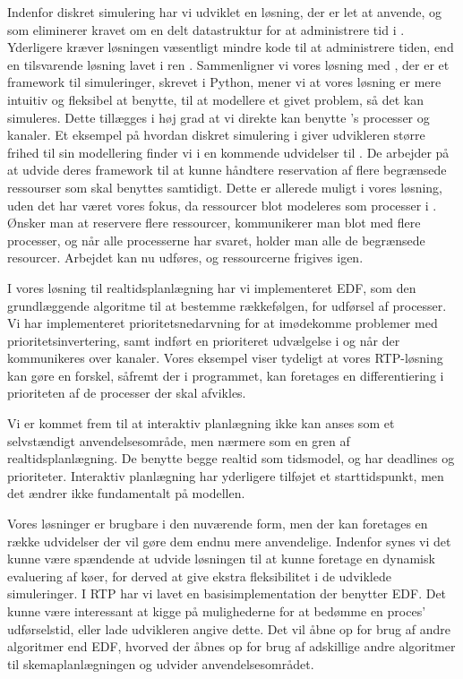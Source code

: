 Indenfor diskret simulering har vi udviklet en løsning, der er let at anvende, og som eliminerer kravet om en delt datastruktur for at administrere tid i \pycsp. Yderligere kræver løsningen væsentligt mindre kode til at administrere tiden, end en tilsvarende løsning lavet i ren \pycsp. 
Sammenligner vi vores løsning med \simpy, der er et framework til simuleringer, skrevet i Python, mener vi at vores løsning er mere intuitiv og fleksibel at benytte, til at modellere et givet problem, så det kan  simuleres. Dette tillægges i høj grad at vi direkte kan benytte \pycsp's processer og kanaler. Et eksempel på hvordan diskret simulering i \pycsp giver udvikleren større frihed til sin modellering finder vi i en kommende udvidelser til \simpy. De arbejder  på at udvide deres framework til at kunne håndtere reservation af flere begrænsede ressourser som skal benyttes samtidigt. Dette er allerede muligt i vores løsning, uden det har været vores fokus, da ressourcer blot modeleres som processer i \pycsp. Ønsker man at reservere flere ressourcer, kommunikerer man blot med flere processer, og når alle processerne har svaret, holder man alle de begrænsede resourcer. Arbejdet kan nu udføres, og ressourcerne frigives igen. 

I vores løsning til realtidsplanlægning har vi implementeret EDF, som den grundlæggende algoritme til at bestemme rækkefølgen, for udførsel af processer. Vi har implementeret prioritetsnedarvning for at imødekomme problemer med prioritetsinvertering, samt indført en prioriteret udvælgelse i  og når der kommunikeres over kanaler. Vores eksempel viser tydeligt at vores RTP-løsning kan gøre en forskel, såfremt der i programmet, kan foretages en differentiering i prioriteten af de processer der skal afvikles. 

Vi er kommet frem til at interaktiv planlægning ikke kan anses som et selvstændigt anvendelsesområde, men nærmere som en gren af realtidsplanlægning. De benytte begge realtid som tidsmodel, og har deadlines og prioriteter. Interaktiv planlægning har yderligere tilføjet et starttidspunkt, men det ændrer ikke fundamentalt på modellen. 

Vores løsninger er brugbare i den nuværende form, men der kan foretages en række udvidelser der vil gøre dem endnu mere anvendelige. 
Indenfor \des synes vi det kunne være spændende at udvide løsningen til at kunne foretage en dynamisk evaluering af køer, for derved at give ekstra fleksibilitet i de udviklede simuleringer. I RTP har vi lavet en basisimplementation der benytter EDF. Det kunne være interessant at kigge på mulighederne for at bedømme en proces' udførselstid, eller lade udvikleren angive dette. Det vil åbne op for brug af andre algoritmer end EDF, hvorved der åbnes op for brug af adskillige andre algoritmer til skemaplanlægningen og udvider anvendelsesområdet.  







